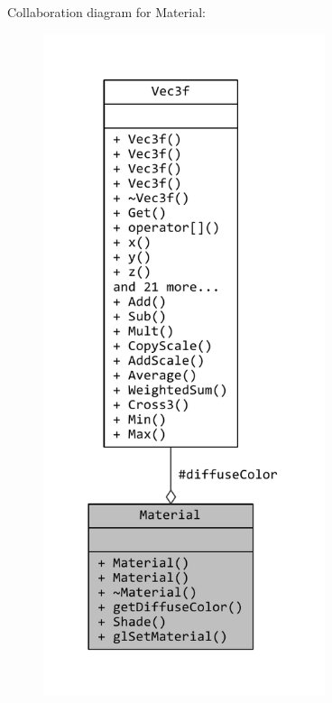 Collaboration diagram for Material\+:
\nopagebreak
\begin{figure}[H]
\begin{center}
\leavevmode
\includegraphics[height=550pt]{classMaterial__coll__graph}
\end{center}
\end{figure}
